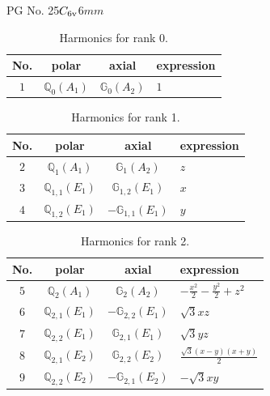 \documentclass[fleqn,8pt,landscape]{jsarticle}
\begin{document}
\setcounter{MaxMatrixCols}{32}

\renewcommand{\tablename}{Table~}
\renewcommand{\figurename}{Figure~}
\begin{center}
\LARGE
PG No. 25\quad$C_{\rm 6v}$\quad$6mm$\quad[ hexagonal ]
\end{center}
\begin{table}[ht!]
\begin{center}
\caption{Harmonics for rank 0.}
\renewcommand{\arraystretch}{1.3}
\begin{tabular}{cccl} \hline \hline
No. & polar & axial & expression \\ \hline
$ 1 $ & $ \mathbb{Q}_{0}(A_{1}) $ & $ \mathbb{G}_{0}(A_{2}) $ & $ 1 $ \\
 \hline \hline
\end{tabular}
\end{center}
\end{table}
\begin{table}[ht!]
\begin{center}
\caption{Harmonics for rank 1.}
\renewcommand{\arraystretch}{1.3}
\begin{tabular}{cccl} \hline \hline
No. & polar & axial & expression \\ \hline
$ 2 $ & $ \mathbb{Q}_{1}(A_{1}) $ & $ \mathbb{G}_{1}(A_{2}) $ & $ z $ \\
$ 3 $ & $ \mathbb{Q}_{1,1}(E_{1}) $ & $ \mathbb{G}_{1,2}(E_{1}) $ & $ x $ \\
$ 4 $ & $ \mathbb{Q}_{1,2}(E_{1}) $ & $ -\mathbb{G}_{1,1}(E_{1}) $ & $ y $ \\
 \hline \hline
\end{tabular}
\end{center}
\end{table}
\begin{table}[ht!]
\begin{center}
\caption{Harmonics for rank 2.}
\renewcommand{\arraystretch}{1.3}
\begin{tabular}{cccl} \hline \hline
No. & polar & axial & expression \\ \hline
$ 5 $ & $ \mathbb{Q}_{2}(A_{1}) $ & $ \mathbb{G}_{2}(A_{2}) $ & $ - \frac{x^{2}}{2} - \frac{y^{2}}{2} + z^{2} $ \\
$ 6 $ & $ \mathbb{Q}_{2,1}(E_{1}) $ & $ -\mathbb{G}_{2,2}(E_{1}) $ & $ \sqrt{3} x z $ \\
$ 7 $ & $ \mathbb{Q}_{2,2}(E_{1}) $ & $ \mathbb{G}_{2,1}(E_{1}) $ & $ \sqrt{3} y z $ \\
$ 8 $ & $ \mathbb{Q}_{2,1}(E_{2}) $ & $ \mathbb{G}_{2,2}(E_{2}) $ & $ \frac{\sqrt{3} \left(x - y\right) \left(x + y\right)}{2} $ \\
$ 9 $ & $ \mathbb{Q}_{2,2}(E_{2}) $ & $ -\mathbb{G}_{2,1}(E_{2}) $ & $ - \sqrt{3} x y $ \\
 \hline \hline
\end{tabular}
\end{center}
\end{table}
\end{document}
